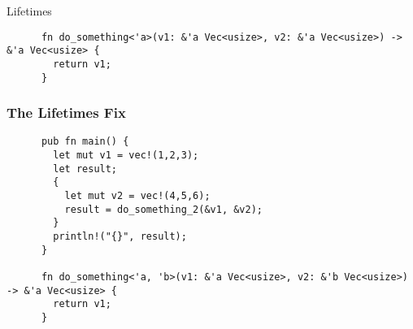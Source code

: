 \begin{section}{Lifetimes}
\begin{frame}[fragile]
\begin{verbatim}
      fn do_something<'a>(v1: &'a Vec<usize>, v2: &'a Vec<usize>) -> &'a Vec<usize> {
        return v1;
      }
    \end{verbatim}
  \end{frame}

  \begin{frame}[fragile]
    \frametitle{The Lifetimes Fix}
    \begin{verbatim}
      pub fn main() {
        let mut v1 = vec!(1,2,3);
        let result;
        {
          let mut v2 = vec!(4,5,6);
          result = do_something_2(&v1, &v2);
        }
        println!("{}", result);
      }

      fn do_something<'a, 'b>(v1: &'a Vec<usize>, v2: &'b Vec<usize>) -> &'a Vec<usize> {
        return v1;
      }
    \end{verbatim}
  \end{frame}

\end{section}
